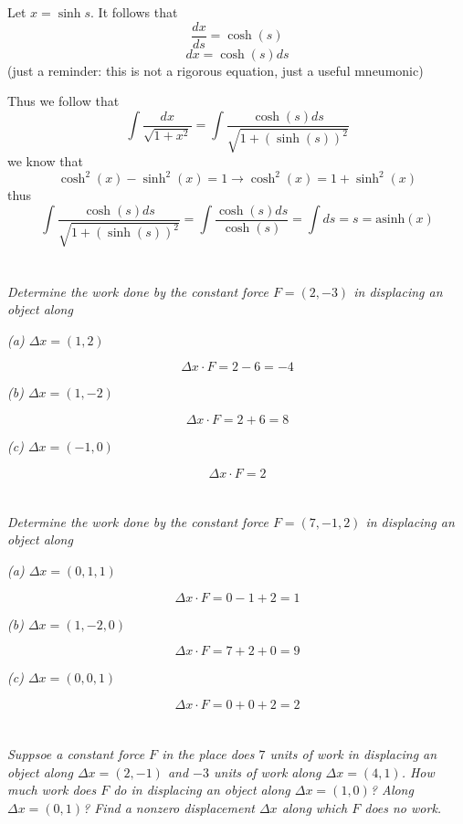 \documentclass[11pt,oneside,titlepage]{book}
\begin{document}
Let $x = \sinh s$. It follows that
$$\frac{dx}{ds} = \cosh(s)$$
$$dx = \cosh(s) ds$$
(just a reminder: this is not a  rigorous equation, just a useful mneumonic)

Thus we follow that
$$\int{\frac{dx}{\sqrt{1 + x^2}}}
= \int{\frac{\cosh(s) ds}{\sqrt{1 + (\sinh( s))^2}}}
$$
we know that 
$$\cosh^2 (x) - \sinh^2(x) = 1 \to \cosh^2 (x) = 1 + \sinh^2(x)$$
thus
$$\int{\frac{\cosh(s) ds}{\sqrt{1 + (\sinh( s))^2}}} =
\int{\frac{\cosh(s) ds}{\cosh(s)}} = \int{ds} = s = \text{asinh}(x)$$

\section{}

\textit{Determine the work done by the constant force $F = (2, -3)$ in displacing an
  object along}

\textit{(a) $\Delta x = (1, 2)$}

$$\Delta x \cdot F = 2 - 6 = -4$$

\textit{(b) $\Delta x = (1, -2)$}

$$\Delta x \cdot F = 2 + 6 = 8$$

\textit{(c) $\Delta x = (-1, 0)$}

$$\Delta x \cdot F = 2 $$

\section{}

\textit{Determine the work done by the constant force $F = (7, -1, 2)$ in displacing an
  object along}

\textit{(a) $\Delta x = (0, 1, 1)$}

$$\Delta x \cdot F = 0 - 1 + 2 = 1 $$

\textit{(b) $\Delta x = (1, -2, 0)$}

$$\Delta x \cdot F = 7 + 2 + 0 = 9$$

\textit{(c) $\Delta x = (0, 0, 1)$}

$$\Delta x \cdot F = 0 + 0 + 2  = 2$$

\section{}

\textit{Suppsoe a constant force $F$ in the place does $7$ units of work in displacing an
  object along $\Delta x = (2, -1)$ and $-3$ units of work along $\Delta x = (4, 1)$. How
  much work does $F$ do in displacing an object along $\Delta x = (1, 0)$? Along
  $\Delta x = (0, 1)$? Find a nonzero displacement $\Delta x$ along which $F$ does no work.}
\end{document}
